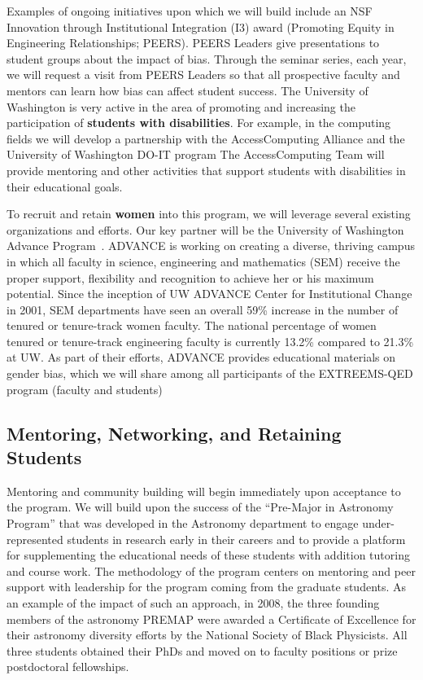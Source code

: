 Examples of ongoing initiatives upon which we will build include an
NSF Innovation through Institutional Integration (I3) award (Promoting
Equity in Engineering Relationships; PEERS). PEERS Leaders give
presentations to student groups about the impact of bias. Through the
seminar series, each year, we will request a visit from PEERS Leaders
so that all prospective faculty and mentors can learn how bias can
affect student success.  The University of Washington is very active
in the area of promoting and increasing the participation of {\bf
  students with disabilities}. For example, in the computing fields we
will develop a partnership with the AccessComputing Alliance
and the University
of Washington DO-IT program
The AccessComputing Team will provide mentoring and other activities
that support students with disabilities in their educational goals.

To recruit and retain {\bf women} into this program, we will leverage
several existing organizations and efforts.  Our key partner will be
the University of Washington Advance Program~\cite{}.  ADVANCE is
working on creating a diverse, thriving campus in which all faculty in
science, engineering and mathematics (SEM) receive the proper support,
flexibility and recognition to achieve her or his maximum
potential. Since the inception of UW ADVANCE Center for Institutional
Change in 2001, SEM departments have seen an overall 59\% increase in
the number of tenured or tenure-track women faculty. The national
percentage of women tenured or tenure-track engineering faculty is
currently 13.2\% compared to 21.3\% at UW. As part of their efforts,
ADVANCE provides educational materials on gender bias, which we will
share among all participants of the EXTREEMS-QED program (faculty and
students)

\subsection{Mentoring, Networking, and Retaining Students}

Mentoring and community building will begin immediately upon
acceptance to the program. We will build upon the success of the
``Pre-Major in Astronomy Program''\cite{garner2010diversity} that was
developed in the Astronomy department to engage under-represented
students in research early in their careers and to provide a platform
for supplementing the educational needs of these students with
addition tutoring and course work. The methodology of the program
centers on mentoring and peer support with leadership for the program
coming from the graduate students.  As an example of the impact of
such an approach, in 2008, the three founding members of the astronomy
PREMAP were awarded a Certificate of Excellence for their astronomy
diversity efforts by the National Society of Black Physicists. All
three students obtained their PhDs and moved on to faculty positions
or prize postdoctoral fellowships.

